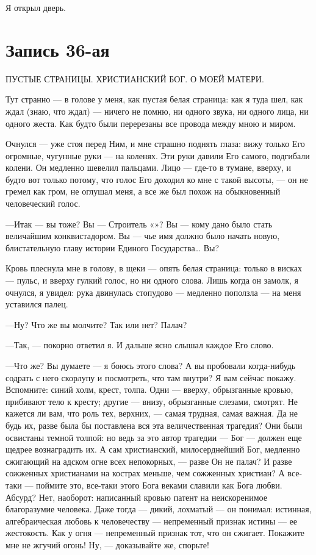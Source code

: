 \documentclass[11pt,openany]{book}
\newcommand{\bookchapterplain}[1]{%
  \clearpage\phantomsection\chapter*{#1}%
  \addcontentsline{toc}{chapter}{#1}\markboth{#1}{#1}\thispagestyle{plain}}
\begin{document}
Я открыл дверь.

\bookchapterplain{Запись 36-ая}

\begin{center}\textsc{ПУСТЫЕ СТРАНИЦЫ. ХРИСТИАНСКИЙ БОГ. О МОЕЙ МАТЕРИ.}\end{center}

Тут странно --- в голове у меня, как пустая белая страница: как я туда шел, как ждал (знаю, что ждал) --- ничего не помню, ни одного звука, ни одного лица, ни одного жеста. Как будто были перерезаны все провода между мною и миром.

Очнулся --- уже стоя перед Ним, и мне страшно поднять глаза: вижу только Его огромные, чугунные руки --- на коленях. Эти руки давили Его самого, подгибали колени. Он медленно шевелил пальцами. Лицо --- где-то в тумане, вверху, и будто вот только потому, что голос Его доходил ко мне с такой высоты, --- он не гремел как гром, не оглушал меня, а все же был похож на обыкновенный человеческий голос.

---Итак --- вы тоже? Вы --- Строитель «»? Вы --- кому дано было стать величайшим конквистадором. Вы --- чье имя должно было начать новую, блистательную главу истории Единого Государства\ldots{} Вы?

Кровь плеснула мне в голову, в щеки --- опять белая страница: только в висках --- пульс, и вверху гулкий голос, но ни одного слова. Лишь когда он замолк, я очнулся, я увидел: рука двинулась стопудово --- медленно поползла --- на меня уставился палец.

---Ну? Что же вы молчите? Так или нет? Палач?

---Так, --- покорно ответил я. И дальше ясно слышал каждое Его слово.

---Что же? Вы думаете --- я боюсь этого слова? А вы пробовали когда-нибудь содрать с него скорлупу и посмотреть, что там внутри? Я вам сейчас покажу. Вспомните: синий холм, крест, толпа. Одни --- вверху, обрызганные кровью, прибивают тело к кресту; другие --- внизу, обрызганные слезами, смотрят. Не кажется ли вам, что роль тех, верхних, --- самая трудная, самая важная. Да не будь их, разве была бы поставлена вся эта величественная трагедия? Они были освистаны темной толпой: но ведь за это автор трагедии --- Бог --- должен еще щедрее вознаградить их. А сам христианский, милосерднейший Бог, медленно сжигающий на адском огне всех непокорных, --- разве Он не палач? И разве сожженных христианами на кострах меньше, чем сожженных христиан? А все-таки --- поймите это, все-таки этого Бога веками славили как Бога любви. Абсурд? Нет, наоборот: написанный кровью патент на неискоренимое благоразумие человека. Даже тогда --- дикий, лохматый --- он понимал: истинная, алгебраическая любовь к человечеству --- непременный признак истины --- ее жестокость. Как у огня --- непременный признак тот, что он сжигает. Покажите мне не жгучий огонь! Ну, --- доказывайте же, спорьте!
\end{document}
